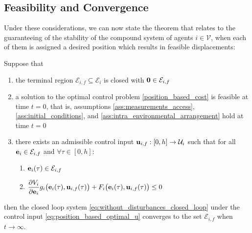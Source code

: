 \subsection{Feasibility and Convergence}

Under these considerations, we can now state the theorem that relates to
the guaranteeing of the stability of the compound system of agents
$i \in \mathcal{V}$, when each of them is assigned a desired
position which results in feasible displacements:\\

\begin{bw_box}
\begin{theorem}

  Suppose that

  \begin{enumerate}
    \item the terminal region $\mathcal{E}_{i,f} \subseteq \mathcal{E}_i$ is
      closed with $\bm{\mathbf{0}} \in \mathcal{E}_{i,f}$
    \item a solution to the optimal control problem \eqref{position_based_cost}
      is feasible at time $t=0$, that is, assumptions
      \eqref{ass:measurements_access}, \eqref{ass:initial_conditions}, and
      \eqref{ass:intra_environmental_arrangement} hold at time $t=0$
    \item there exists an admissible control input
      $\bm{\mathbf{u}}_{i,f} : [0, h] \to \mathcal{U}_i$ such that for all
      $\bm{\mathbf{e}}_i \in \mathcal{E}_{i,f}$ and $\forall \tau \in [0,h]$:

      \begin{enumerate}
        \item $\bm{\mathbf{e}}_i(\tau) \in \mathcal{E}_{i,f}$
        \item $\dfrac{\partial V_i}{\partial \bm{\mathbf{e}}_i} g_i\big(\bm{\mathbf{e}}_i(\tau), \bm{\mathbf{u}}_{i,f}(\tau)\big)
          + F_i\big(\bm{\mathbf{e}}_i(\tau), \bm{\mathbf{u}}_{i,f}(\tau)\big) \leq 0$
      \end{enumerate}

  \end{enumerate}

  then the closed loop system \eqref{eq:without_disturbances_closed_loop} under
  the control input \eqref{eq:position_based_optimal_u} converges to the set
  $\mathcal{E}_{i,f}$ when $t \to \infty$.
  \label{theorem:with_disturbances}
\end{theorem}
\end{bw_box}


